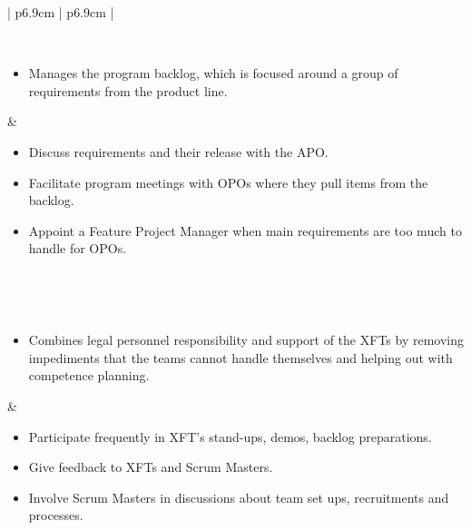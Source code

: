 \begin{table}[h]
   \begin{tabularx}{\textwidth}{ | p{6.9cm} | p{6.9cm} | }
   
   \hline
   
   
   \\ \hline
   
   \begin{itemize}[label={}, leftmargin=*, topsep=0pt, itemsep=0pt, partopsep=0pt]
     \item Manages the program backlog, which is focused around a group of requirements from the product line.
   \end{itemize} & 
   
   \begin{itemize}[label={}, leftmargin=*, topsep=0pt, itemsep=0pt, partopsep=0pt]
     \item Discuss requirements and their release with the \ac{APO}.
     \item Facilitate program meetings with \acp{OPO} where they pull items from the backlog.
     \item Appoint a Feature Project Manager when main requirements are too much to handle for \acp{OPO}.
   \end{itemize} 
   
   \\ \hline
   
   
   \\ \hline 
   
   \begin{itemize}[label={}, leftmargin=*, topsep=0pt, itemsep=0pt, partopsep=0pt]
     \item Combines legal personnel responsibility and support of the \acp{XFT} by removing impediments that the teams cannot handle themselves and helping out with competence planning.  
   \end{itemize} & 
   
   \begin{itemize}[label={}, leftmargin=*, topsep=0pt, itemsep=0pt, partopsep=0pt]
     \item Participate frequently in \ac{XFT}'s stand-ups, demos, backlog preparations.
     \item Give feedback to \acp{XFT} and Scrum Masters.
     \item Involve Scrum Masters in discussions about team set ups, recruitments and processes.
   \end{itemize} 
   

\end{tabularx}
\end{table}
